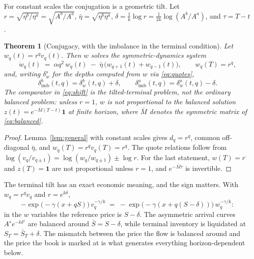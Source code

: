 \documentclass[11pt]{article}
\newtheorem{theorem}{Theorem}
\begin{document}
For constant scales the conjugation is a geometric tilt. Let $r = \sqrt{\eta^b/\eta^a} = \sqrt{A^b/A^a}$, $\bar\eta = \sqrt{\eta^b\eta^a}$, $\delta = \tfrac{1}{k}\log r = \tfrac{1}{2k}\log(A^b/A^a)$, and $\tau = T - t$.

\begin{theorem}[Conjugacy, with the imbalance in the terminal condition]\label{thm:conj}
Let $w_q(t) = r^{q} v_q(t)$. Then $w$ solves the symmetric-dynamics system
\begin{equation}\label{eq:balanced}
\dot w_q(t) \;=\; \alpha q^2\, w_q(t) \;-\; \bar\eta\,\big(w_{q+1}(t) + w_{q-1}(t)\big),
\qquad w_q(T) = r^{q},
\end{equation}
and, writing $\delta^s_{w}$ for the depths computed from $w$ via \eqref{eq:quotes},
\begin{equation}\label{eq:shift}
\delta^b_{\mathrm{imb}}(t,q) = \delta^b_{w}(t,q) + \delta,
\qquad
\delta^a_{\mathrm{imb}}(t,q) = \delta^a_{w}(t,q) - \delta .
\end{equation}
The comparator in \eqref{eq:shift} is the \emph{tilted}-terminal problem, not the ordinary balanced problem: unless $r=1$, $w$ is not proportional to the balanced solution $z(t) = e^{-\bar M (T-t)}\mathbf{1}$ at finite horizon, where $\bar M$ denotes the symmetric matrix of \eqref{eq:balanced}.
\end{theorem}

\begin{proof}
Lemma~\ref{lem:general} with constant scales gives $d_q = r^q$, common off-diagonal $\bar\eta$, and $w_q(T) = r^q v_q(T) = r^q$. The quote relations follow from $\log(v_q/v_{q\pm1}) = \log(w_q/w_{q\pm1}) \pm \log r$. For the last statement, $w(T) = r^{\cdot}$ and $z(T) = \mathbf{1}$ are not proportional unless $r = 1$, and $e^{-\bar M \tau}$ is invertible.
\end{proof}

The terminal tilt has an exact economic meaning, and the sign matters. With $w_q = r^q v_q$ and $r = e^{k\delta}$,
\[
-\exp\big(-\gamma(x+qS)\big)\, v_q^{-\gamma/k} \;=\; -\exp\big(-\gamma(x+q(S-\delta))\big)\, w_q^{-\gamma/k}:
\]
in the $w$ variables the reference price is $S - \delta$. The asymmetric arrival curves $A^s e^{-k\delta^s}$ are balanced around $\bar S = S - \delta$, while terminal inventory is liquidated at $S_T = \bar S_T + \delta$. The mismatch between the price the flow is balanced around and the price the book is marked at is what generates everything horizon-dependent below.
\end{document}
